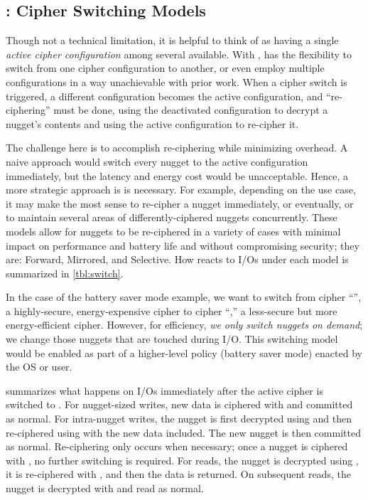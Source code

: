 \subsection{\sysA: Cipher Switching Models}\label{subsec:des-switch}

Though not a technical limitation, it is helpful to think of \sys as having a
single {\em active cipher configuration} among several available. With \sysA,
\sys has the flexibility to switch from one cipher configuration to another, or
even employ multiple configurations in a way unachievable with prior work. When
a cipher switch is triggered, a different configuration becomes the active
configuration, and ``re-ciphering'' must be done, \ie using the deactivated
configuration to decrypt a nugget's contents and using the active configuration
to re-cipher it.

The challenge here is to accomplish re-ciphering while minimizing overhead. A
naive approach would switch every nugget to the active configuration
immediately, but the latency and energy cost would be unacceptable. Hence, a
more strategic approach is is necessary. For example, depending on the use case,
it may make the most sense to re-cipher a nugget immediately, or eventually, or
to maintain several areas of differently-ciphered nuggets concurrently. These
models allow for nuggets to be re-ciphered in a variety of cases with minimal
impact on performance and battery life and without compromising security; they
are: Forward, Mirrored, and Selective. How \sys reacts to I/Os under each model
is summarized in \cref{tbl:switch}.




 In the case of the battery saver mode example, we
want to switch from cipher ``\cone'', a highly-secure, energy-expensive cipher
to cipher ``\ctwo,'' a less-secure but more energy-efficient cipher. However,
for efficiency, {\em we only switch nuggets on demand}; \ie we change those
nuggets that are touched during I/O. This switching model would be enabled as
part of a higher-level policy (\ie battery saver mode) enacted by the OS or
user.

 summarizes what happens on I/Os immediately after the active
cipher is switched to \ctwo. For nugget-sized writes, new data is ciphered with
\ctwo and committed as normal. For intra-nugget writes, the nugget is first
decrypted using \cone and then re-ciphered using \ctwo with the new data
included. The new nugget is then committed as normal. Re-ciphering only occurs
when necessary; once a nugget is ciphered with \ctwo, no further switching is
required. For reads, the nugget is decrypted using \cone, it is re-ciphered with
\ctwo, and then the data is returned. On subsequent reads, the nugget is
decrypted with \ctwo and read as normal.

